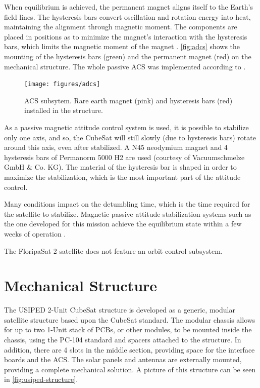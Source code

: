 When equilibrium is achieved, the permanent magnet aligns itself to the Earth's field lines. The hysteresis bars convert oscillation and rotation energy into heat, maintaining the alignment through magnetic moment. The components are placed in positions as to minimize the magnet's interaction with the hysteresis bars, which limits the magnetic moment of the magnet \cite{francois2010}. \autoref{fig:adcs} shows the mounting of the hysteresis bars (green) and the permanent magnet (red) on the mechanical structure. The whole passive ACS was implemented according to \cite{francois2010}.

\begin{figure}[!ht]
    \begin{center}
        \texttt{[image: figures/adcs]}
        \caption{ACS subsytem. Rare earth magnet (pink) and hysteresis bars (red) installed in the structure.}
        \label{fig:adcs}
    \end{center}
\end{figure}

As a passive magnetic attitude control system is used, it is possible to stabilize only one axis, and so, the CubeSat will still slowly (due to hysteresis bars) rotate around this axis, even after stabilized. A N45 neodymium magnet and 4 hysteresis bars of Permanorm 5000 H2 are used (courtesy of Vacuumschmelze GmbH \& Co. KG). The material of the hysteresis bar is shaped in order to maximize the stabilization, which is the most important part of the attitude control.

Many conditions impact on the detumbling time, which is the time required for the satellite to stabilize. Magnetic passive attitude stabilization systems such as the one developed for this mission achieve the equilibrium state within a few weeks of operation \cite{santoni2009}.

The FloripaSat-2 satellite does not feature an orbit control subsystem.

\section{Mechanical Structure}

The USIPED 2-Unit CubeSat structure is developed as a generic, modular satellite structure based upon the CubeSat standard. The modular chassis allows for up to two 1-Unit stack of PCBs, or other modules, to be mounted inside the chassis, using the PC-104 standard and spacers attached to the structure. In addition, there are 4 slots in the middle section, providing space for the interface boards and the ACS. The solar panels and antennas are externally mounted, providing a complete mechanical solution. A picture of this structure can be seen in \autoref{fig:usiped-structure}.

